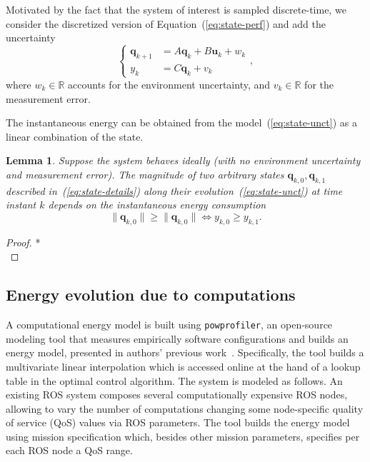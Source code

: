 \documentclass[letterpaper,10pt,conference]{ieeeconf}
\newcommand{\stt}[1]{{\small\tt #1}} %
\newcommand{\powprof}{\stt{powprofiler}}
\newtheorem{lem}[thm]{Lemma}
\begin{document}
Motivated by the fact that the system of interest is sampled discrete-time, we consider the discretized version of Equation~(\ref{eq:state-perf}) and add the uncertainty
\begin{equation}\label{eq:state-unct}
  \begin{cases}
  \mathbf{q}_{k+1}&=A\mathbf{q}_{k}+B\mathbf{u}_{k}+w_k\\
  y_k&=C\mathbf{q}_k+v_k
  \end{cases},
\end{equation}
where $w_k\in\mathbb{R}$ accounts for the environment uncertainty, and $v_k\in\mathbb{R}$ for the measurement error.

The instantaneous energy can be obtained from the model~(\ref{eq:state-unct}) as a linear combination of the state.

\begin{lem}\label{lem:state-vs-energy}
  Suppose the system behaves ideally (with no environment uncertainty and measurement error).
  The magnitude of two arbitrary states $\mathbf{q}_{k,0},\mathbf{q}_{k,1}$ described in~(\ref{eq:state-details}) along their evolution~(\ref{eq:state-unct}) at time instant $k$ depends on the instantaneous energy consumption
  \begin{equation}
    \|\mathbf{q}_{k,0}\|\geq\|\mathbf{q}_{k,0}\|\iff y_{k,0}\geq y_{k,1}.
  \end{equation}
\end{lem}
\begin{proof}
  *\\
\end{proof}

\subsection{Energy evolution due to computations}
\label{sec:computations-model}

A computational energy model is built using \powprof{}, an open-source modeling tool that measures empirically software configurations and builds an energy model, presented in authors' previous work~\cite{seewald2019coarse}. Specifically, the tool builds a multivariate linear interpolation which is accessed online at the hand of a lookup table in the optimal control algorithm. The system is modeled as follows. An existing ROS system composes several computationally expensive ROS nodes, allowing to vary the number of computations changing some node-specific quality of service (QoS) values via ROS parameters. The tool builds the energy model using mission specification which, besides other mission parameters, specifies per each ROS node a QoS range.
\end{document}
